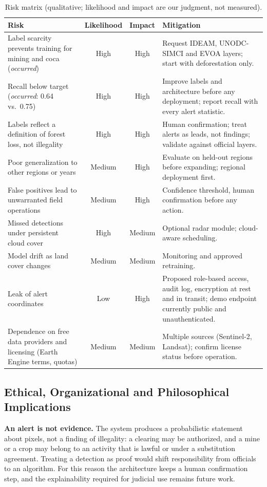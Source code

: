 \documentclass{article}
\begin{document}
\begin{table}[H]
\centering
\caption{Risk matrix (qualitative; likelihood and impact are our judgment, not measured).}
\label{tab:risks}
\begin{tabularx}{\linewidth}{X c c X}
\toprule
\textbf{Risk} & \textbf{Likelihood} & \textbf{Impact} & \textbf{Mitigation} \\
\midrule
Label scarcity prevents training for mining and coca (\emph{occurred}) & High & High & Request IDEAM, UNODC-SIMCI and EVOA layers; start with deforestation only. \\
Recall below target (\emph{occurred}: 0.64 vs.\ 0.75) & High & High & Improve labels and architecture before any deployment; report recall with every alert statistic. \\
Labels reflect a definition of forest loss, not illegality & High & High & Human confirmation; treat alerts as leads, not findings; validate against official layers. \\
Poor generalization to other regions or years & Medium & High & Evaluate on held-out regions before expanding; regional deployment first. \\
False positives lead to unwarranted field operations & Medium & High & Confidence threshold, human confirmation before any action. \\
Missed detections under persistent cloud cover & High & Medium & Optional radar module; cloud-aware scheduling. \\
Model drift as land cover changes & Medium & Medium & Monitoring and approved retraining. \\
Leak of alert coordinates & Low & High & Proposed role-based access, audit log, encryption at rest and in transit; demo endpoint currently public and unauthenticated. \\
Dependence on free data providers and licensing (Earth Engine terms, quotas) & Medium & Medium & Multiple sources (Sentinel-2, Landsat); confirm license status before operation. \\
\bottomrule
\end{tabularx}
\end{table}

\subsection{Ethical, Organizational and Philosophical Implications}
\label{sec:ethics}

\textbf{An alert is not evidence.} The system produces a probabilistic
statement about pixels, not a finding of illegality: a clearing may be
authorized, and a mine or a crop may belong to an activity that is lawful or
under a substitution agreement. Treating a detection as proof would shift
responsibility from officials to an algorithm. For this reason the architecture
keeps a human confirmation step, and the explainability required for judicial
use remains future work.
\end{document}
